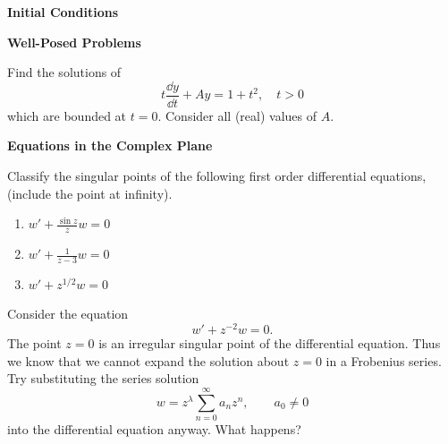 {%
\begin{large}
  \noindent
  \textbf{Initial Conditions}
\end{large}







\begin{large}
  \noindent
  \textbf{Well-Posed Problems}
\end{large}





\begin{Exercise}
  \label{exercise t dydt + A y}
  Find the solutions of
  \[
  t \frac{\dd y}{\dd t} + A y = 1 + t^2, \quad t > 0
  \]
  which are bounded at $t = 0$.  Consider all (real) values of $A$.

\end{Exercise}



\begin{large}
  \noindent
  \textbf{Equations in the Complex Plane}
\end{large}




\begin{Exercise} 
  \label{exercise dwdz + sin z z w}
  Classify the singular points of the following first order differential
  equations, (include the point at infinity).
  \begin{enumerate}
  \item $w' + \frac{\sin z}{z} w = 0$
  \item $w' + \frac{1}{z-3} w = 0$
  \item $w' + z^{1/2} w = 0$
  \end{enumerate}

\end{Exercise}







\begin{Exercise} 
  \label{exercise dwdz z-2 w}
  Consider the equation
  \[ 
  w' + z^{-2}w = 0.
  \]
  The point $z = 0$ is an irregular singular point of the differential
  equation.  Thus we know that we cannot expand the solution about
  $z=0$ in a Frobenius series.  Try substituting the series solution
  \[
  w = z^\lambda \sum_{n=0}^\infty a_n z^n, \qquad a_0 \neq 0
  \]
  into the differential equation anyway.  What happens?


\end{Exercise}}
